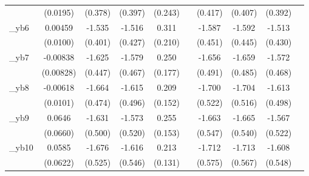 \begin{table}[htbp]
\begin{tabular}{l*{9}{c}}
            &    (0.0195)         &     (0.378)         &     (0.397)         &     (0.243)         &                     &     (0.417)         &     (0.407)         &     (0.392)         &                     \\
[1em]
\_yb6        &     0.00459         &      -1.535\sym{***}&      -1.516\sym{***}&       0.311         &                     &      -1.587\sym{***}&      -1.592\sym{***}&      -1.513\sym{***}&                     \\
            &    (0.0100)         &     (0.401)         &     (0.427)         &     (0.210)         &                     &     (0.451)         &     (0.445)         &     (0.430)         &                     \\
[1em]
\_yb7        &    -0.00838         &      -1.625\sym{***}&      -1.579\sym{***}&       0.250         &                     &      -1.656\sym{***}&      -1.659\sym{***}&      -1.572\sym{***}&                     \\
            &   (0.00828)         &     (0.447)         &     (0.467)         &     (0.177)         &                     &     (0.491)         &     (0.485)         &     (0.468)         &                     \\
[1em]
\_yb8        &    -0.00618         &      -1.664\sym{***}&      -1.615\sym{***}&       0.209         &                     &      -1.700\sym{***}&      -1.704\sym{***}&      -1.613\sym{***}&                     \\
            &    (0.0101)         &     (0.474)         &     (0.496)         &     (0.152)         &                     &     (0.522)         &     (0.516)         &     (0.498)         &                     \\
[1em]
\_yb9        &      0.0646         &      -1.631\sym{***}&      -1.573\sym{***}&       0.255\sym{*}  &                     &      -1.663\sym{***}&      -1.665\sym{***}&      -1.567\sym{***}&                     \\
            &    (0.0660)         &     (0.500)         &     (0.520)         &     (0.153)         &                     &     (0.547)         &     (0.540)         &     (0.522)         &                     \\
[1em]
\_yb10       &      0.0585         &      -1.676\sym{***}&      -1.616\sym{***}&       0.213         &                     &      -1.712\sym{***}&      -1.713\sym{***}&      -1.608\sym{***}&                     \\
            &    (0.0622)         &     (0.525)         &     (0.546)         &     (0.131)         &                     &     (0.575)         &     (0.567)         &     (0.548)         &                     \\

\end{tabular}
\end{table}
